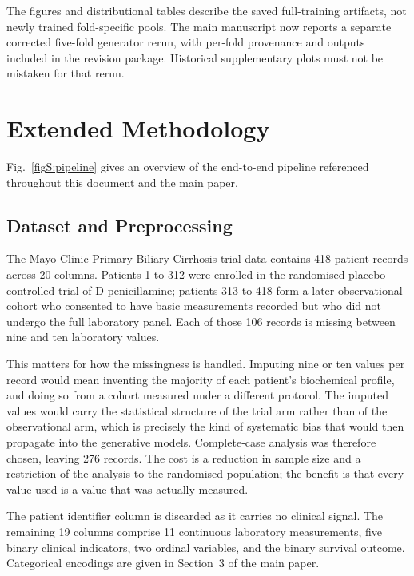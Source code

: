 \documentclass[manuscript,review,screen,nonacm]{acmart}
\newif\ifshowrevisions
\DeclareRobustCommand{\rev}[1]{\ifshowrevisions{\color{revisionblue}#1}\else#1\fi}
\begin{document}
\rev{The figures and distributional tables describe the saved full-training artifacts, not newly trained fold-specific pools. The main manuscript now reports a separate corrected five-fold generator rerun, with per-fold provenance and outputs included in the revision package. Historical supplementary plots must not be mistaken for that rerun.}

\section{Extended Methodology}

Fig.~\ref{figS:pipeline} gives an overview of the end-to-end pipeline referenced throughout this document and the main paper.

\subsection{Dataset and Preprocessing}

The Mayo Clinic Primary Biliary Cirrhosis trial data contains 418 patient records across 20 columns. Patients 1 to 312 were enrolled in the randomised placebo-controlled trial of D-penicillamine; patients 313 to 418 form a later observational cohort who consented to have basic measurements recorded but who did not undergo the full laboratory panel. Each of those 106 records is missing between nine and ten laboratory values.

This matters for how the missingness is handled. Imputing nine or ten values per record would mean inventing the majority of each patient's biochemical profile, and doing so from a cohort measured under a different protocol. The imputed values would carry the statistical structure of the trial arm rather than of the observational arm, which is precisely the kind of systematic bias that would then propagate into the generative models. Complete-case analysis was therefore chosen, leaving 276 records. The cost is a reduction in sample size and a restriction of the analysis to the randomised population; the benefit is that every value used is a value that was actually measured.

\rev{The patient identifier column is discarded as it carries no clinical signal. The remaining 19 columns comprise 11 continuous laboratory measurements, five binary clinical indicators, two ordinal variables, and the binary survival outcome. Categorical encodings are given in Section~3 of the main paper.}
\end{document}
